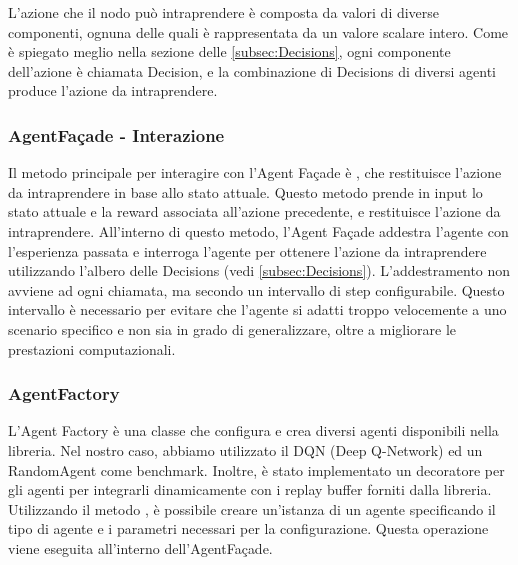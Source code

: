 \documentclass[conference]{IEEEtran}
\begin{document}
L'azione che il nodo può intraprendere è composta da valori di diverse componenti,
ognuna delle quali è rappresentata da un valore scalare intero. Come è spiegato meglio
nella sezione delle \autoref{subsec:Decisions}, ogni componente dell'azione è chiamata Decision, e 
la combinazione di Decisions di diversi agenti produce l'azione da intraprendere.
\subsubsection{AgentFaçade - Interazione}
Il metodo principale per interagire con l'Agent Façade è , che restituisce l'azione da intraprendere in base allo stato attuale. Questo metodo prende in input lo stato attuale e la reward associata all'azione precedente, e restituisce l'azione da intraprendere. All'interno di questo metodo, l'Agent Façade addestra l'agente con l'esperienza passata e interroga l'agente per ottenere l'azione da intraprendere utilizzando l'albero delle Decisions  (vedi \autoref{subsec:Decisions}). L'addestramento non avviene ad ogni chiamata, ma secondo un intervallo di step configurabile. Questo intervallo è necessario per evitare che l'agente si adatti troppo velocemente a uno scenario specifico e non sia in grado di generalizzare, oltre a migliorare le prestazioni computazionali.

\subsubsection{AgentFactory}
L'Agent Factory è una classe che configura e crea diversi agenti disponibili nella libreria. Nel nostro caso, abbiamo utilizzato il DQN (Deep Q-Network) ed un RandomAgent come benchmark. Inoltre, è stato implementato un decoratore per gli agenti per integrarli dinamicamente con i replay buffer forniti dalla libreria. Utilizzando il metodo , è possibile creare un'istanza di un agente specificando il tipo di agente e i parametri necessari per la configurazione. Questa operazione viene eseguita all'interno dell'AgentFaçade.
\end{document}
